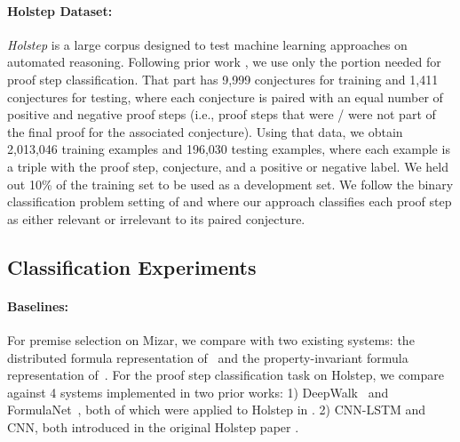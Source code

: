 \documentclass{article}
\begin{document}
\paragraph{Holstep Dataset: } \emph{Holstep} \cite{kaliszyk2017holstep} is a large corpus designed to test machine learning approaches on automated reasoning. Following prior work \cite{kaliszyk2017holstep,wang2017premise}, we use only the portion needed for proof step classification. That part has 9,999 conjectures for training and 1,411 conjectures for testing, where each conjecture is paired with an equal number of positive and negative proof steps (i.e., proof steps that were / were not part of the final proof for the associated conjecture). Using that data, we obtain 2,013,046 training examples and 196,030 testing examples, where each example is a triple with the proof step, conjecture, and a positive or negative label. We held out 10\% of the training set to be used as a development set. We follow the binary classification problem setting of \cite{wang2017premise} and \cite{kaliszyk2017holstep} where our approach classifies each proof step as either relevant or irrelevant to its paired conjecture.

 


\subsection{Classification Experiments}
\label{sec:classification}


\paragraph{Baselines:} For premise selection on Mizar, we compare with two existing systems: the distributed formula representation of~\cite{kucik2018premise} and the property-invariant formula representation of~\cite{olvsak2019property}. For the proof step classification task on Holstep, we compare against 4 systems implemented in two prior works: 1) DeepWalk~\cite{perozzi2014deepwalk} and FormulaNet~\cite{wang2017premise}, both of which were applied to Holstep in \cite{wang2017premise}. 2) CNN-LSTM and CNN, both introduced in the original Holstep paper \cite{kaliszyk2017holstep}.
\end{document}
